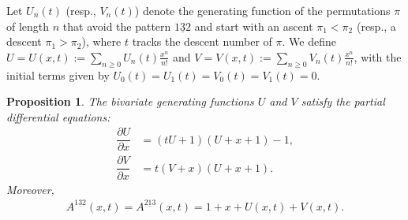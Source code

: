 \documentclass[11pt,reqno]{amsart}
\numberwithin{equation}{section}
\theoremstyle{plain}
\newtheorem{proposition}[theorem]{Proposition}
\theoremstyle{definition}
\begin{document}
Let $U_n(t)$ (resp., $V_n(t)$) denote the generating function of the permutations $\pi$ of length $n$ that avoid the pattern $\underline{132}$ and start with an ascent $\pi_1 < \pi_2$ (resp., a descent $\pi_1 > \pi_2$), where $t$ tracks the descent number of $\pi$.
We define $U = U(x,t) := \sum_{n \geq 0} U_n(t) \frac{x^n}{n!}$ and $V = V(x,t) := \sum_{n \geq 0} V_n(t) \frac{x^n}{n!}$, with the initial terms given by $U_0(t) = U_1(t) = V_0(t) = V_1(t) = 0$.

\begin{proposition} \label{132}
The bivariate generating functions $U$ and $V$ satisfy the partial differential equations:
    \begin{align*}
    \dfrac{\partial U}{\partial x} &=(tU+1)(U+x+1)-1,\\
    \dfrac{\partial V}{\partial x} &=t(V+x)(U+x+1).
    \end{align*}
    Moreover,
    \begin{align*}
    A^{\underline{132}}(x,t)=A^{\underline{213}}(x,t)=1+x+U(x,t)+V(x,t).
    \end{align*}
\end{proposition}
\end{document}
